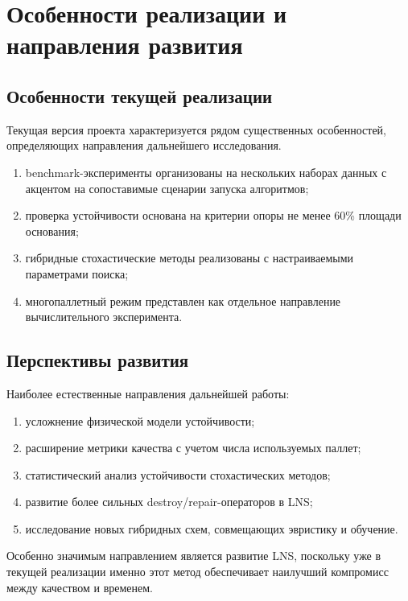 \documentclass[14pt,a4paper]{extarticle}
\begin{document}
\pagebreak

\section{Особенности реализации и направления развития}

\subsection{Особенности текущей реализации}

Текущая версия проекта характеризуется рядом существенных особенностей, определяющих направления дальнейшего исследования.

\begin{enumerate}
  \item benchmark-эксперименты организованы на нескольких наборах данных с акцентом на сопоставимые сценарии запуска алгоритмов;
  \item проверка устойчивости основана на критерии опоры не менее 60\% площади основания;
  \item гибридные стохастические методы реализованы с настраиваемыми параметрами поиска;
  \item многопаллетный режим представлен как отдельное направление вычислительного эксперимента.
\end{enumerate}

\subsection{Перспективы развития}

Наиболее естественные направления дальнейшей работы:
\begin{enumerate}
  \item усложнение физической модели устойчивости;
  \item расширение метрики качества с учетом числа используемых паллет;
  \item статистический анализ устойчивости стохастических методов;
  \item развитие более сильных destroy/repair-операторов в LNS;
  \item исследование новых гибридных схем, совмещающих эвристику и обучение.
\end{enumerate}

Особенно значимым направлением является развитие LNS, поскольку уже в текущей реализации именно этот метод обеспечивает наилучший компромисс между качеством и временем.
\end{document}
